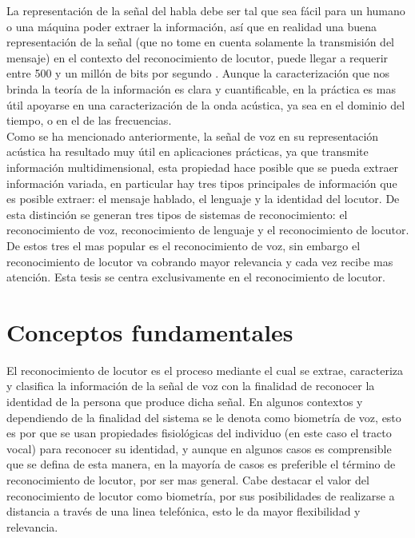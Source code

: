 La representaci\'on de la señal del habla debe ser tal que sea f\'acil para un humano o una m\'aquina poder extraer la informaci\'on, as\'i que en realidad una buena representaci\'on de la señal (que no tome en cuenta solamente la transmisi\'on del mensaje) en el contexto del reconocimiento de locutor, puede llegar a requerir entre 500 y un mill\'on de bits por segundo \cite{rabiner1987}. Aunque la caracterizaci\'on que nos brinda la teor\'ia de la informaci\'on es clara y cuantificable, en la pr\'actica es mas \'util apoyarse en una caracterizaci\'on de la onda ac\'ustica, ya sea en el dominio del tiempo, o en el de las frecuencias.\\

Como se ha mencionado anteriormente, la señal de voz en su representaci\'on ac\'ustica ha resultado muy \'util en aplicaciones pr\'acticas, ya que transmite informaci\'on multidimensional, esta propiedad hace posible que se pueda extraer informaci\'on variada, en particular hay tres tipos principales de informaci\'on que es posible extraer: el mensaje hablado, el lenguaje y la identidad del locutor. De esta distinci\'on se generan tres tipos de sistemas de reconocimiento: el reconocimiento de voz, reconocimiento de lenguaje y el reconocimiento de locutor. De estos tres el mas popular es el reconocimiento de voz, sin embargo el reconocimiento de locutor va cobrando mayor relevancia y cada vez recibe mas atenci\'on. Esta tesis se centra exclusivamente en el reconocimiento de locutor.\\



\section{Conceptos fundamentales}

El reconocimiento de locutor es el proceso mediante el cual se extrae, caracteriza y clasifica la informaci\'on de la señal de voz con la finalidad de reconocer la identidad de la persona que produce dicha señal. En algunos contextos y dependiendo de la finalidad del sistema se le denota como biometr\'ia de voz, esto es por que se usan propiedades fisiol\'ogicas del individuo (en este caso el tracto vocal) para reconocer su identidad, y aunque en algunos casos es comprensible que se defina de esta manera, en la mayor\'ia de casos es preferible el t\'ermino de reconocimiento de locutor, por ser mas general. Cabe destacar el valor del reconocimiento de locutor como biometr\'ia, por sus posibilidades de realizarse a distancia a trav\'es de una linea telef\'onica, esto le da mayor flexibilidad y relevancia.\\

